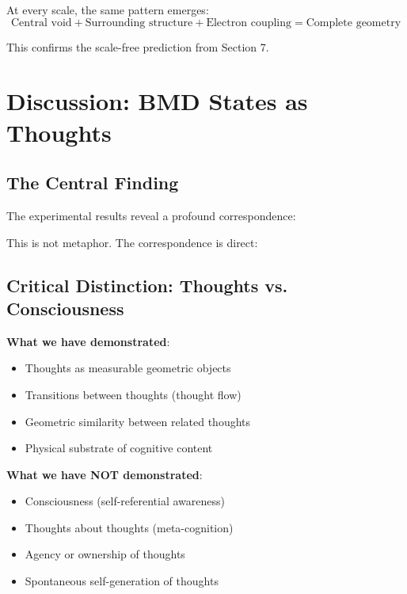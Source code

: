 At every scale, the same pattern emerges:
\begin{equation}
\text{Central void} + \text{Surrounding structure} + \text{Electron coupling} = \text{Complete geometry}
\end{equation}

This confirms the scale-free prediction from Section 7.

\section{Discussion: BMD States as Thoughts}

\subsection{The Central Finding}

The experimental results reveal a profound correspondence:

\begin{center}
\end{center}

This is not metaphor. The correspondence is direct:

\subsection{Critical Distinction: Thoughts vs. Consciousness}

\textbf{What we have demonstrated}:
\begin{itemize}
\item Thoughts as measurable geometric objects
\item Transitions between thoughts (thought flow)
\item Geometric similarity between related thoughts
\item Physical substrate of cognitive content
\end{itemize}

\textbf{What we have NOT demonstrated}:
\begin{itemize}
\item Consciousness (self-referential awareness)
\item Thoughts about thoughts (meta-cognition)
\item Agency or ownership of thoughts
\item Spontaneous self-generation of thoughts
\end{itemize}

